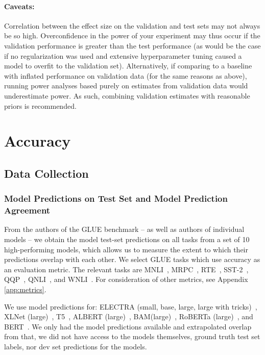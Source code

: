 \documentclass[11pt,a4paper]{article}
\begin{document}
\paragraph{Caveats:} Correlation between the effect size on the validation and test sets may not always be so high. Overconfidence in the power of your experiment may thus occur if the validation performance is greater than the test performance (as would be the case if no regularization was used and extensive hyperparameter tuning caused a model to overfit to the validation set). Alternatively, if comparing to a baseline with inflated performance on validation data (for the same reasons as above), running power analyses based purely on estimates from validation data would underestimate power. As such, combining validation estimates with reasonable priors is recommended.


\section{Accuracy}
\label{app:mde_table}

\subsection{Data Collection}

\subsubsection{Model Predictions on Test Set and Model Prediction Agreement}
From the authors of the GLUE benchmark -- as well as authors of individual models -- we obtain the model test-set predictions on all tasks from a set of 10 high-performing models, which allows us to measure the extent to which their predictions overlap with each other. We select GLUE tasks which use accuracy as an evaluation metric. The relevant tasks are MNLI~\citep{williams2018broad}, MRPC~\citep{dolan-brockett-2005-automatically}, RTE~\citep{dagan2005pascal,bar2006second,giampiccolo2007third,bentivogli2009fifth}, SST-2~\citep{socher2013recursive}, QQP~\citep{iyer2017first}, QNLI~\citep{rajpurkar2016squad}, and WNLI~\citep{levesque2012winograd}. For consideration of other metrics, see Appendix \ref{app:metrics}. 

We use model predictions for: ELECTRA (small, base, large, large with tricks)~\citep{clark2019electra}, XLNet (large)~\citep{yang2019xlnet}, T5~\citep{raffel2019exploring}, ALBERT (large)~\citep{lan2019albert}, BAM(large)~\citep{clark2019bam}, RoBERTa (large)~\citep{liu2019roberta}, and BERT~\citep{devlin2018bert}. We only had the model predictions available and extrapolated overlap from that, we did not have access to the models themselves, ground truth test set labels, nor dev set predictions for the models.
\end{document}
